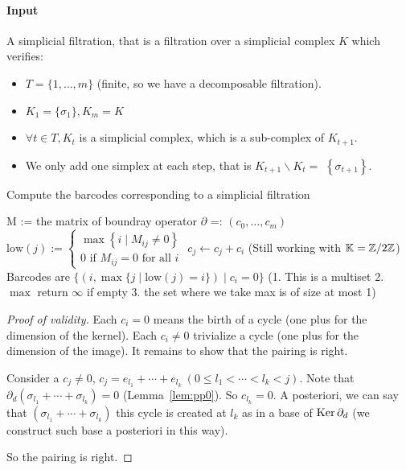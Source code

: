 \paragraph{Input} A simplicial filtration, that is a filtration over a simplicial complex $K$ which verifies:
\begin{itemize}
  \item $T=\{1, \ldots, m\}$ (finite, so we have a decomposable filtration).
  \item $K_1=\{\sigma_1\}, K_m = K$
  \item $\forall t \in T, K_t$ is a simplicial complex,
  which is a sub-complex of $K_{t+1}$.
  \item We only add one simplex at each step,
  that is $K_{t+1} \backslash K_t=$ $\left\{\sigma_{t+1}\right\}$.
\end{itemize}

\begin{algorithm}
  \caption{Compute the barcodes corresponding to a simplicial filtration}
  \begin{algorithmic}
  \State M := the matrix of boundray operator $\partial$ =: $(c_0, \ldots, c_m)$
  \State $\mathrm{low}(j):=\left\{\begin{array}{l}\max \left\{i \mid M_{i j} \neq 0\right\} \\ 0 \text { if } M_{i j}=0 \text { for all } i\end{array}\right.$
  \State $c_j \gets c_j+c_i$ (Still working with $\mathbb{K} = \mathbb{Z}/2\mathbb{Z}$)
  \EndWhile
  \EndFor
  \State Barcodes are $\{(i, \max\{j \mid \mathrm{low}(j)=i\}) \mid c_i = 0\}$
  (1. This is a multiset 2. $\max$ return $\infty$ if empty 3. the set where we take max is of size at most 1)
  \end{algorithmic}
\end{algorithm}

\begin{proof}[Proof of validity]
Each $c_i = 0$ means the birth of a cycle (one plus for the dimension of the kernel).
Each $c_i \not= 0$ trivialize a cycle (one plus for the dimension of the image).
It remains to show that the pairing is right.

Consider a $c_j \not= 0$, $c_j = e_{l_1} + \cdots + e_{l_k}~(0\le l_1 < \cdots < l_k < j)$.
Note that $\partial_d (\sigma_{l_1} + \cdots + \sigma_{l_k}) = 0$ (Lemma~\ref{lem:pp0}).
So $c_{l_k} = 0$. A posteriori, we can say that $(\sigma_{l_1} + \cdots + \sigma_{l_k})$
this cycle is created at $l_k$ as in a base of $\operatorname{Ker} \partial_d$ (we construct
such base a posteriori in this way).

So the pairing is right.

\end{proof}

